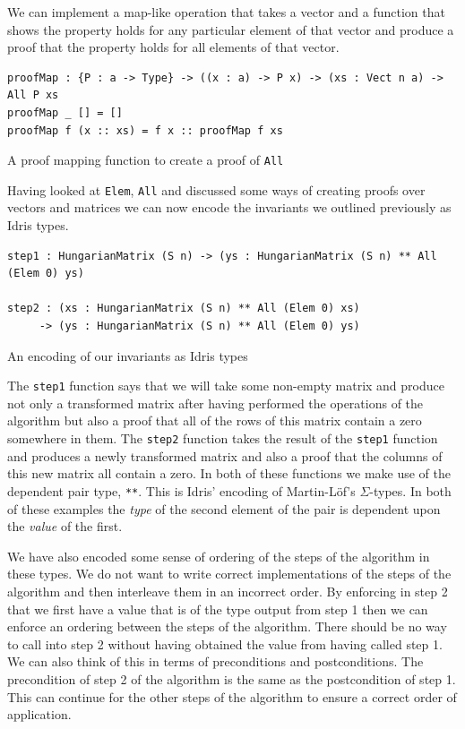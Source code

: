 \documentclass[a4paper, notitlepage]{report}
\begin{document}
We can implement a map-like operation that takes a vector and a function that
shows the property holds for any particular element of that vector and produce a
proof that the property holds for all elements of that vector.

\begin{listing}[H]
\begin{verbatim}
proofMap : {P : a -> Type} -> ((x : a) -> P x) -> (xs : Vect n a) -> All P xs
proofMap _ [] = []
proofMap f (x :: xs) = f x :: proofMap f xs
\end{verbatim}
\caption{A proof mapping function to create a proof of \texttt{All}}
\end{listing}

Having looked at \texttt{Elem}, \texttt{All} and discussed some ways of creating proofs over
vectors and matrices we can now encode the invariants we outlined previously as
Idris types.

\begin{listing}[H]
\begin{verbatim}
step1 : HungarianMatrix (S n) -> (ys : HungarianMatrix (S n) ** All (Elem 0) ys)

step2 : (xs : HungarianMatrix (S n) ** All (Elem 0) xs)
     -> (ys : HungarianMatrix (S n) ** All (Elem 0) ys)
\end{verbatim}
\caption{An encoding of our invariants as Idris types}
\end{listing}

The \texttt{step1} function says that we will take some non-empty matrix and produce not
only a transformed matrix after having performed the operations of the algorithm
but also a proof that all of the rows of this matrix contain a zero somewhere in
them. The \texttt{step2} function takes the result of the \texttt{step1} function and produces a
newly transformed matrix and also a proof that the columns of this new matrix
all contain a zero. In both of these functions we make use of the dependent pair
type, \texttt{**}. This is Idris' encoding of Martin-Löf's \(\Sigma\)-types. In both of these
examples the \emph{type} of the second element of the pair is dependent upon the \emph{value}
of the first.

We have also encoded some sense of ordering of the steps of the algorithm in
these types. We do not want to write correct implementations of the steps of the
algorithm and then interleave them in an incorrect order. By enforcing in step 2
that we first have a value that is of the type output from step 1 then we can
enforce an ordering between the steps of the algorithm. There should be no way
to call into step 2 without having obtained the value from having called step 1.
We can also think of this in terms of preconditions and postconditions. The
precondition of step 2 of the algorithm is the same as the postcondition of
step 1. This can continue for the other steps of the algorithm to ensure a
correct order of application.
\end{document}
